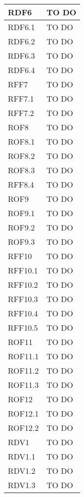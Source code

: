 \begin{center}
\begin{longtable}{| p{4cm} | p{8cm} |}
RDF6   &  TO DO \\
\hline
RDF6.1   &  TO DO \\
\hline
RDF6.2   &  TO DO \\
\hline
RDF6.3   &  TO DO \\
\hline
RDF6.4   &  TO DO \\
\hline

RFF7   &  TO DO \\
\hline
RFF7.1   &  TO DO \\
\hline
RFF7.2   &  TO DO \\
\hline

ROF8   &  TO DO \\
\hline
ROF8.1   &  TO DO \\
\hline
ROF8.2   &  TO DO \\
\hline
ROF8.3   &  TO DO \\
\hline
RFF8.4   &  TO DO \\
\hline

ROF9   &  TO DO \\
\hline
ROF9.1   &  TO DO \\
\hline
ROF9.2   &  TO DO \\
\hline
ROF9.3   &  TO DO \\
\hline

RFF10   &  TO DO \\
\hline
RFF10.1   &  TO DO \\
\hline
RFF10.2   &  TO DO \\
\hline
RFF10.3   &  TO DO \\
\hline
RFF10.4   &  TO DO \\
\hline
RFF10.5   &  TO DO \\
\hline

ROF11   &  TO DO \\
\hline
ROF11.1   &  TO DO \\
\hline
ROF11.2   &  TO DO \\
\hline
ROF11.3   &  TO DO \\
\hline

ROF12   &  TO DO \\
\hline
ROF12.1   &  TO DO \\
\hline
ROF12.2   &  TO DO \\
\hline


RDV1   &  TO DO \\
\hline
RDV1.1   &  TO DO \\
\hline
RDV1.2   &  TO DO \\
\hline
RDV1.3   &  TO DO \\
\hline


\end{longtable}
\end{center}
